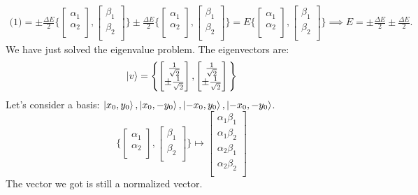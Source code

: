 \documentclass{article}
\begin{document}
\begin{align*}
    \bigl(1\bigl) =\pm \frac{\Delta E}{2} \Biggl\{ \begin{bmatrix}
    \alpha_1 \\
    \alpha_2 \\
\end{bmatrix},\begin{bmatrix}
    \beta_1 \\
    \beta_2 \\
\end{bmatrix}  \Biggl\} \pm \frac{\Delta E}{2} \Biggl\{ \begin{bmatrix}
    \alpha_1 \\
    \alpha_2 \\
\end{bmatrix},\begin{bmatrix}
    \beta_1 \\
    \beta_2 \\
\end{bmatrix} \Biggl\} = E \Biggl\{ \begin{bmatrix}
    \alpha_1 \\
    \alpha_2 \\
\end{bmatrix},\begin{bmatrix}
    \beta_1 \\
    \beta_2 \\
\end{bmatrix} \Biggl\} \implies E = \pm \frac{\Delta E}{2} \pm \frac{\Delta E}{2}.
\end{align*}
We have just solved the eigenvalue problem. The eigenvectors are:
$$ \ket{v} = \Biggl\{ \begin{bmatrix}
     \frac{1}{\sqrt{2}} \\
    \pm \frac{1}{\sqrt{2}} \\ 
\end{bmatrix}, \begin{bmatrix}
     \frac{1}{\sqrt{2}} \\
    \pm \frac{1}{\sqrt{2}} \\ 
\end{bmatrix} \Biggl\}
$$
Let's consider a basis: $ \ket{x_0,y_0}, \ket{x_0, -y_0}, \ket{-x_0,y_0}, \ket{-x_0,-y_0}$.
 $$\Biggl\{ \begin{bmatrix}
    \alpha_1 \\
    \alpha_2 \\
\end{bmatrix},\begin{bmatrix}
    \beta_1 \\
    \beta_2 \\
\end{bmatrix} \Biggl\} \mapsto \begin{bmatrix}
    \alpha_1 \beta_1 \\
    \alpha_1 \beta_2 \\
    \alpha_2 \beta_1 \\ 
    \alpha_2 \beta_2 \\
\end{bmatrix}$$
The vector we got is still a normalized vector.
\end{document}
